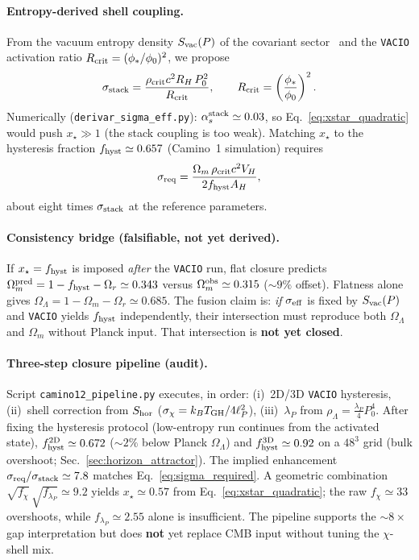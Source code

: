 \documentclass[prd,
               reprint,
               aps,
               preprintnumbers,
               nofootinbib,
               longbibliography,
               floatfix]{revtex4-2}
\begin{document}
\paragraph{Entropy-derived shell coupling.}
From the vacuum entropy density $S_{\rm vac}(P)$ of the covariant
sector~\cite{gravedad3zenodo} and the \texttt{VACIO} activation ratio
$R_{\rm crit}=(\phi_\ast/\phi_0)^2$, we propose
\begin{equation}
\label{eq:sigma_stack}
\sigma_{\rm stack}
=
\frac{\rho_{\rm crit}c^2 R_H\,P_0^2}{R_{\rm crit}},
\qquad
R_{\rm crit}=\left(\frac{\phi_\ast}{\phi_0}\right)^2.
\end{equation}
Numerically (\texttt{derivar\_sigma\_eff.py}):
$\alpha_s^{\rm stack}\simeq 0.03$, so Eq.~\eqref{eq:xstar_quadratic} would push
$x_\star\gg 1$ (the stack coupling is too weak).
Matching $x_\star$ to the hysteresis fraction
$f_{\rm hyst}\simeq 0.657$ (Camino~1 simulation) requires
\begin{equation}
\label{eq:sigma_required}
\sigma_{\rm req}
=
\frac{\Omega_m\,\rho_{\rm crit}c^2V_H}{2 f_{\rm hyst} A_H},
\end{equation}
about eight times $\sigma_{\rm stack}$ at the reference parameters.

\paragraph{Consistency bridge (falsifiable, not yet derived).}
If $x_\star=f_{\rm hyst}$ is imposed \emph{after} the \texttt{VACIO}
run, flat closure predicts
$\Omega_m^{\rm pred}=1-f_{\rm hyst}-\Omega_r\simeq 0.343$ versus
$\Omega_m^{\rm obs}\simeq 0.315$ ($\sim 9\%$ offset).
Flatness alone gives
$\Omega_\Lambda=1-\Omega_m-\Omega_r\simeq 0.685$.
The fusion claim is: \emph{if} $\sigma_{\rm eff}$ is fixed by
$S_{\rm vac}(P)$ and \texttt{VACIO} yields $f_{\rm hyst}$ independently,
their intersection must reproduce both $\Omega_\Lambda$ and $\Omega_m$
without Planck input.
That intersection is \textbf{not yet closed}.

\paragraph{Three-step closure pipeline (audit).}
Script \texttt{camino12\_pipeline.py} executes, in order:
(i)~2D/3D \texttt{VACIO} hysteresis,
(ii)~shell correction from $S_{\rm hor}$ ($\sigma_\chi=k_BT_{\rm GH}/4\ell_P^2$),
(iii)~$\lambda_P$ from $\rho_\Lambda=\frac{\lambda_P}{4}P_0^4$.
After fixing the hysteresis protocol (low-entropy run continues from the
activated state), $f_{\rm hyst}^{\rm 2D}\simeq 0.672$ ($\sim 2\%$ below
Planck $\Omega_\Lambda$) and $f_{\rm hyst}^{\rm 3D}\simeq 0.92$ on a
$48^3$ grid (bulk overshoot; Sec.~\ref{sec:horizon_attractor}).
The implied enhancement $\sigma_{\rm req}/\sigma_{\rm stack}\simeq 7.8$
matches Eq.~\eqref{eq:sigma_required}.
A geometric combination $\sqrt{f_\chi}\,\sqrt{f_{\lambda_P}}\simeq 9.2$
yields $x_\star\simeq 0.57$ from Eq.~\eqref{eq:xstar_quadratic}; the
raw $f_\chi\simeq 33$ overshoots, while $f_{\lambda_P}\simeq 2.55$ alone
is insufficient.
The pipeline supports the $\sim 8\times$ gap interpretation but does
\textbf{not} yet replace CMB input without tuning the $\chi$-shell mix.
\end{document}
